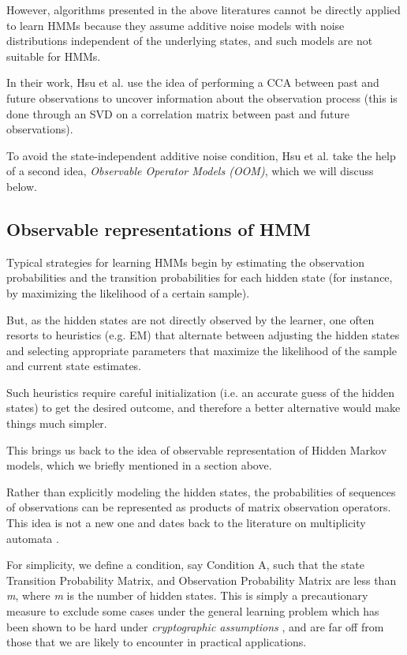 However, algorithms presented in the above literatures cannot be directly
applied to learn HMMs because they assume additive noise models with noise distributions independent of the underlying states, and such models are not suitable for HMMs.

In their work, Hsu et al.\cite{ref2} use the idea of performing a CCA between past and future observations to uncover information about the observation process (this is done through
an SVD on a correlation matrix between past and future observations).

To avoid the state-independent additive noise condition, Hsu et al.\cite{ref2} take the help of a second idea, \textit{Observable Operator Models (OOM)}, which we will discuss below.

\subsection{Observable representations of HMM}

Typical strategies for learning HMMs begin by estimating the observation probabilities and the transition probabilities for each hidden state (for instance, by maximizing the likelihood of a certain sample).

But, as the hidden states are not directly observed by the learner, one often resorts to heuristics (e.g. EM) that alternate
between adjusting the hidden states and selecting appropriate parameters that maximize the likelihood of the sample and current state estimates. 

Such heuristics require careful initialization (i.e. an accurate guess of the hidden states) to get the desired outcome, and therefore a better alternative would make things much simpler. 

This brings us back to the idea of observable representation of Hidden Markov models, which we briefly mentioned in a section above.

Rather than explicitly modeling the hidden states, the probabilities of sequences of observations can be represented as products of matrix observation operators. This idea is not a new one and dates back to
the literature on multiplicity automata \cite{ref15} \cite{ref16}.

For simplicity, we define a condition, say Condition A, such that the state Transition Probability Matrix, and Observation Probability Matrix are less than \textit{m}, where \textit{m} is the number of hidden states. This is simply a precautionary measure to exclude some cases under the general learning problem which has been shown to be hard under \textit{cryptographic assumptions} \cite{ref18}, and are far off from those that we are likely to encounter in practical applications.



